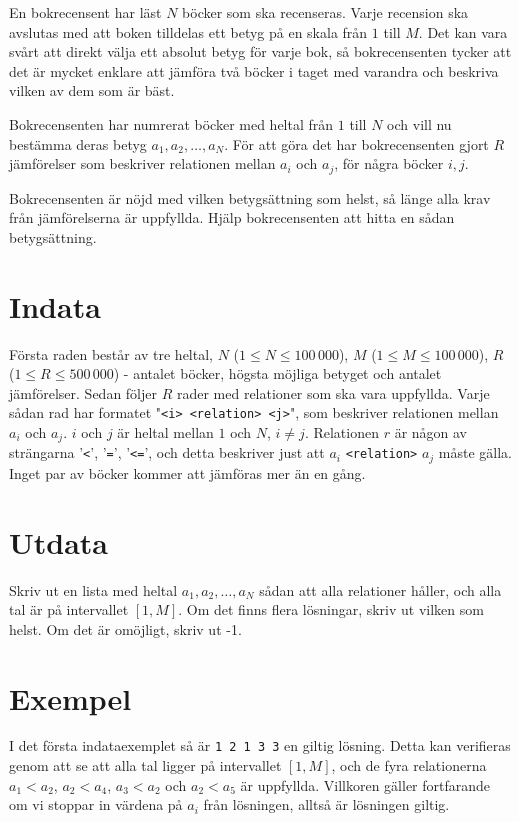 
En bokrecensent har läst $N$ böcker som ska recenseras. Varje recension ska
avslutas med att boken tilldelas ett betyg på en skala från $1$ till $M$. Det kan
vara svårt att direkt välja ett absolut betyg för varje bok, så
bokrecensenten tycker att det är mycket enklare att jämföra två böcker i
taget med varandra och beskriva vilken av dem som är bäst.

Bokrecensenten har numrerat böcker med heltal från $1$ till $N$ och vill nu
bestämma deras betyg $a_1, a_2, \dots , a_N$. För att göra det har
bokrecensenten gjort $R$ jämförelser som beskriver relationen mellan $a_i$ och
$a_j$, för några böcker $i, j$.

Bokrecensenten är nöjd med vilken betygsättning som helst, så länge alla krav
från jämförelserna är uppfyllda. Hjälp bokrecensenten att hitta en sådan
betygsättning.

\section*{Indata}

Första raden består av tre heltal, $N$ ($1 \leq N \leq 100\,000$), 
$M$ ($1 \leq M \leq 100\,000$),
$R$ ($1 \leq R \leq 500\,000$) - antalet böcker, högsta möjliga
betyget och antalet jämförelser. Sedan följer $R$ rader med relationer som ska
vara
uppfyllda. Varje sådan rad har formatet "\texttt{<i> <relation> <j>}",
som beskriver relationen mellan $a_i$ och $a_j$. $i$ och $j$ är heltal mellan
$1$ och $N$, $i \neq j$. Relationen $r$ är någon av strängarna '\texttt{<}', '\texttt{=}',
'\texttt{<=}', och detta beskriver just att $a_i$ \texttt{<relation>} $a_j$ måste gälla.
Inget par av böcker kommer att jämföras mer än en gång.

\section*{Utdata}

Skriv ut en lista med heltal $a_1, a_2, \ldots , a_N$ sådan att alla relationer håller, och
alla tal är på intervallet $[1, M]$. Om det finns flera lösningar, skriv ut vilken som helst.
Om det är omöjligt, skriv ut -1.

\section*{Exempel}
I det första indataexemplet så är \texttt{1 2 1 3 3} en giltig lösning. Detta kan verifieras
genom att se att alla tal ligger på intervallet $[1, M]$, och de fyra relationerna $a_1 < a_2$,
 $a_2 < a_4$, $a_3 < a_2$ och $a_2 < a_5$ är uppfyllda. Villkoren gäller fortfarande om vi stoppar
 in värdena på $a_i$ från lösningen, alltså är lösningen giltig.

